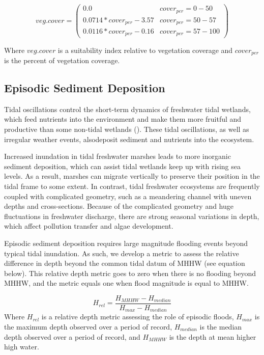 \documentclass[
]{book}
\begin{document}
\[veg.cover = \begin{pmatrix} 0.0 & cover_{per}=0-50\\
0.0714*cover_{per}-3.57 & cover_{per}=50-57\\
0.0116*cover_{per}-0.16 & cover_{per}=57-100
\end{pmatrix}\]

Where \(veg.cover\) is a suitability index relative to vegetation coverage and \(cover_{per}\) is the percent of vegetation coverage.

\hypertarget{episodic-sediment-deposition}{%
\subsection{Episodic Sediment Deposition}\label{episodic-sediment-deposition}}

Tidal oscillations control the short-term dynamics of freshwater tidal wetlands, which feed nutrients into the environment and make them more fruitful and productive than some non-tidal wetlands (\citet{propato_evaluating_2018}). These tidal oscillations, as well as irregular weather events, alsodeposit sediment and nutrients into the ecosystem.

Increased inundation in tidal freshwater marshes leads to more inorganic sediment deposition, which can assist tidal wetlands keep up with rising sea levels. As a result, marshes can migrate vertically to preserve their position in the tidal frame to some extent. In contrast, tidal freshwater ecosystems are frequently coupled with complicated geometry, such as a meandering channel with uneven depths and cross-sections. Because of the complicated geometry and huge fluctuations in freshwater discharge, there are strong seasonal variations in depth, which affect pollution transfer and algae development.

Episodic sediment deposition requires large magnitude flooding events beyond typical tidal inundation. As such, we develop a metric to assess the relative difference in depth beyond the common tidal datum of MHHW (see equation below). This relative depth metric goes to zero when there is no flooding beyond MHHW, and the metric equals one when flood magnitude is equal to MHHW.

\[H_{rel} = \frac{H_{MHHW} - H_{median}}{H_{max} - H_{median}}\]
Where \(H_{rel}\) is a relative depth metric assessing the role of episodic floods, \(H_{max}\) is the maximum depth observed over a period of record, \(H_{median}\) is the median depth observed over a period of record, and \(H_{MHHW}\) is the depth at mean higher high water.
\end{document}
